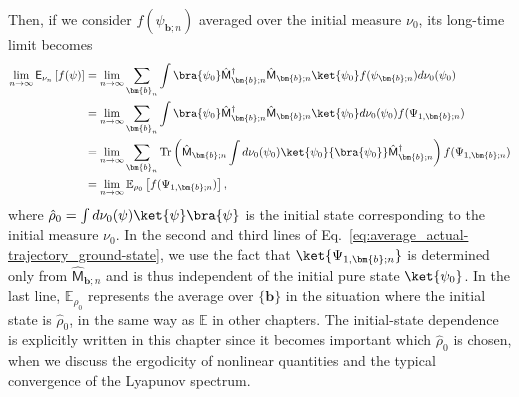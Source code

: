 \documentclass[preprint,pteplogo]{ptephy_v2}%
\numberwithin{equation}{section}
\theoremstyle{definition}
\begin{document}
Then, if we consider $f(\psi_{\bm{b};n})$ averaged over the initial measure $\nu_0$, its long-time limit becomes
\begin{align}
    \lim_{n\rightarrow\infty}
    \mathsf{E}_{\nu_n}\left[f(\psi)\right]&
    =\lim_{n\rightarrow\infty}\sum_{\bm{b}_n}\int\bra{\psi_0}\hat{\mathsf{M}}_{\bm{b};n}^\dagger\hat{\mathsf{M}}_{\bm{b};n}\ket{\psi_0}f(\psi_{\bm{b};n})d\nu_0(\psi_0)\nonumber\\
    &=\lim_{n\rightarrow\infty}\sum_{\bm{b}_n}\int\bra{\psi_0}\hat{\mathsf{M}}_{\bm{b};n}^\dagger\hat{\mathsf{M}}_{\bm{b};n}\ket{\psi_0}d\nu_0(\psi_0)f(\Psi_{1,\bm{b};n})\nonumber\\
    &=\lim_{n\rightarrow\infty}\sum_{\bm{b}_n}\mathrm{Tr}\left(\hat{\mathsf{M}}_{\bm{b};n}\int d\nu_0(\psi_0)\ket{\psi_0}{\bra{\psi_0}}\hat{\mathsf{M}}_{\bm{b};n}^\dagger\right)f(\Psi_{1,\bm{b};n})\nonumber\\
    &=\lim_{n\rightarrow\infty}\mathbb{E}_{\rho_0}\left[f(\Psi_{1,\bm{b};n})\right],
    \label{eq:average_actual-trajectory_ground-state}
\end{align}
where $\hat{\rho}_0=\int d\nu_0(\psi)\ket{\psi}\bra{\psi}$ is the initial state corresponding to the initial measure $\nu_0$. 
In the second and third lines of Eq.~\eqref{eq:average_actual-trajectory_ground-state}, we use the fact that $\ket{\Psi_{1,\bm{b};n}}$ is determined only from $\hat{\mathsf{M}}_{\bm{b};n}$ and is thus independent of the initial pure state $\ket{\psi_0}$. 
In the last line, $\mathbb{E}_{\rho_0}$ represents the average over $\{\bm{b}\}$ in the situation where the initial state is $\hat{\rho}_0$, in the same way as $\mathbb{E}$ in other chapters. 
The initial-state dependence is explicitly written in this chapter since it becomes important which $\hat{\rho}_0$ is chosen, when we discuss the ergodicity of nonlinear quantities and the typical convergence of the Lyapunov spectrum. 
\end{document}
